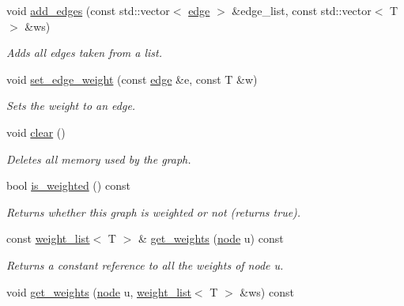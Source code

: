 \begin{DoxyCompactItemize}
void \hyperlink{classlgraph_1_1wxgraph_a73b0fd5a842fcc862e32e293901892ec}{add\+\_\+edges} (const std\+::vector$<$ \hyperlink{namespacelgraph_a76bd7d50719f03de7a85db259d80d572}{edge} $>$ \&edge\+\_\+list, const std\+::vector$<$ T $>$ \&ws)
\begin{DoxyCompactList}\small\item\em Adds all edges taken from a list. \end{DoxyCompactList}\item 
void \hyperlink{classlgraph_1_1wxgraph_a9779e7b5d0a767d4b3c61a7c9a4c2449}{set\+\_\+edge\+\_\+weight} (const \hyperlink{namespacelgraph_a76bd7d50719f03de7a85db259d80d572}{edge} \&e, const T \&w)
\begin{DoxyCompactList}\small\item\em Sets the weight to an edge. \end{DoxyCompactList}\item 
void \hyperlink{classlgraph_1_1wxgraph_a5ce8055002673c718131a091b3f17fc0}{clear} ()
\begin{DoxyCompactList}\small\item\em Deletes all memory used by the graph. \end{DoxyCompactList}\item 
\mbox{\label{classlgraph_1_1wxgraph_a5b1bd3a7ce3c6c628ccde1cf1c2ba130}} 
bool \hyperlink{classlgraph_1_1wxgraph_a5b1bd3a7ce3c6c628ccde1cf1c2ba130}{is\+\_\+weighted} () const
\begin{DoxyCompactList}\small\item\em Returns whether this graph is weighted or not (returns true). \end{DoxyCompactList}\item 
const \hyperlink{namespacelgraph_a1e0fd5ef0a78b2a92da48adbed265cb6}{weight\+\_\+list}$<$ T $>$ \& \hyperlink{classlgraph_1_1wxgraph_a468406b24e0d61a96b7106b845c5c718}{get\+\_\+weights} (\hyperlink{namespacelgraph_a397169dd66adf725210a30fb7251773e}{node} u) const
\begin{DoxyCompactList}\small\item\em Returns a constant reference to all the weights of node {\itshape u}. \end{DoxyCompactList}\item 
void \hyperlink{classlgraph_1_1wxgraph_a423a6e9eb99fd40d9aae73e7ff5adca9}{get\+\_\+weights} (\hyperlink{namespacelgraph_a397169dd66adf725210a30fb7251773e}{node} u, \hyperlink{namespacelgraph_a1e0fd5ef0a78b2a92da48adbed265cb6}{weight\+\_\+list}$<$ T $>$ \&ws) const

\end{DoxyCompactItemize}
